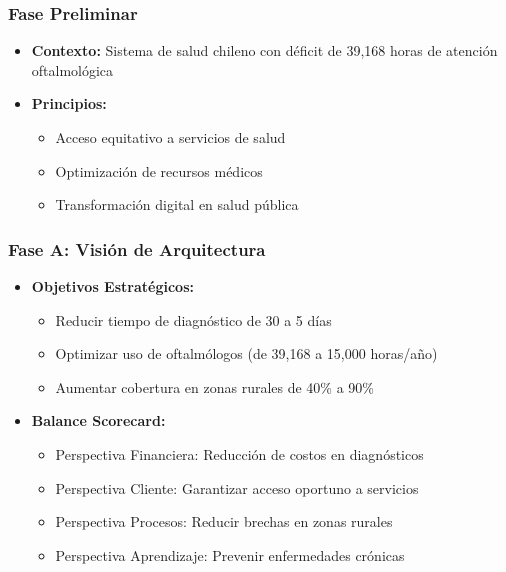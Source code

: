 \subsubsection{Fase Preliminar}
\begin{itemize}
\item \textbf{Contexto:} Sistema de salud chileno con déficit de 39,168 horas de atención oftalmológica
\item \textbf{Principios:} 
  \begin{itemize}
    \item Acceso equitativo a servicios de salud
    \item Optimización de recursos médicos
    \item Transformación digital en salud pública
  \end{itemize}
\end{itemize}

\subsubsection{Fase A: Visión de Arquitectura}
\begin{itemize}
\item \textbf{Objetivos Estratégicos:}
  \begin{itemize}
    \item Reducir tiempo de diagnóstico de 30 a 5 días
    \item Optimizar uso de oftalmólogos (de 39,168 a 15,000 horas/año)
    \item Aumentar cobertura en zonas rurales de 40\% a 90\%
  \end{itemize}
\item \textbf{Balance Scorecard:}
  \begin{itemize}
    \item Perspectiva Financiera: Reducción de costos en diagnósticos
    \item Perspectiva Cliente: Garantizar acceso oportuno a servicios
    \item Perspectiva Procesos: Reducir brechas en zonas rurales
    \item Perspectiva Aprendizaje: Prevenir enfermedades crónicas
  \end{itemize}
\end{itemize}

